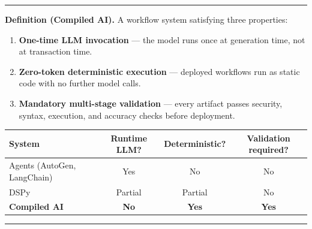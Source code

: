 \documentclass[11pt]{article}
\begin{document}
\begin{center}
\begin{minipage}{0.95\linewidth}
\noindent\rule{\linewidth}{0.6pt}
\vspace{4pt}

\textbf{Definition (Compiled AI).} A workflow system satisfying three properties:
\begin{enumerate}
  \item \textbf{One-time LLM invocation} --- the model runs once at generation time, not at transaction time.
  \item \textbf{Zero-token deterministic execution} --- deployed workflows run as static code with no further model calls.
  \item \textbf{Mandatory multi-stage validation} --- every artifact passes security, syntax, execution, and accuracy checks before deployment.
\end{enumerate}

\begin{center}
{\small\begin{tabular}{lccc}
\toprule
\textbf{System} & \textbf{Runtime LLM?} & \textbf{Deterministic?} & \textbf{Validation required?} \\
\midrule
Agents (AutoGen, LangChain) & Yes & No  & No \\
DSPy                        & Partial & Partial & No \\
\textbf{Compiled AI}        & \textbf{No} & \textbf{Yes} & \textbf{Yes} \\
\bottomrule
\end{tabular}}
\end{center}

\vspace{2pt}
\noindent\rule{\linewidth}{0.6pt}
\end{minipage}
\end{center}
\end{document}
